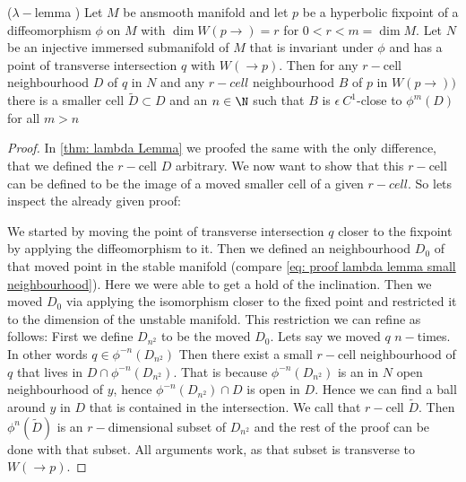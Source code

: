 \begin{lemma}($\lambda-$lemma )
	Let $ M$ be ansmooth manifold and let $p$ be a hyperbolic fixpoint of a diffeomorphism $\phi$ on $M$ with $\dim W(p \to)=r$ for ${0<r<m=\dim M}$. Let $N$ be an injective immersed submanifold of $M$ that is invariant under $\phi$ and has a point of transverse intersection $q$ with $W(\to p)$. Then for any $r-$cell neighbourhood $D$ of $q$ in $N$ and any $r-cell$ neighbourhood $B$ of $p$ in $W(p\to))$ there is a smaller cell $\tilde{D}\subset D$ and an $n\in \N$ such that $B$ is $\epsilon~C^1$-close to $\phi^m(D)$ for all $m>n$
\end{lemma}
\begin{proof}
	In \ref{thm: lambda Lemma} we proofed the same with the only difference, that we defined the $r-$cell $D$ arbitrary. We now want to show that this $r-$cell can be defined to be the image of a moved smaller cell of a given $r-cell$. So lets inspect the already given proof:
	
	We started by moving the point of transverse intersection $q$ closer to the fixpoint by applying the diffeomorphism to it. Then we defined an neighbourhood $D_0$ of that moved point in the stable manifold (compare \ref{eq: proof lambda lemma small neighbourhood}). Here we were able to get a hold of the inclination. Then we moved $D_0$ via applying the isomorphism closer to the fixed point and restricted it to the dimension of the unstable manifold. This restriction we can refine as follows: First we define $D_{n^2}$ to be the moved $D_0$. Lets say we moved $q$ $n-$times. In other words $q\in \phi^{-n}(D_{n^2})$ Then there exist a small $r-$cell neighbourhood of $q$ that lives in $D \cap \phi^{-n}(D_{n^2})$. That is because $ \phi^{-n}(D_{n^2})$ is an in $N$ open neighbourhood of $y$, hence $\phi^{-n}(D_{n^2}) \cap D$ is open in $D$. Hence we can find a ball around $y$ in $D$ that is contained in the intersection. We call that $r-$cell $\tilde{D}$. Then $\phi^n(\tilde{D})$ is an $r-$dimensional subset of $D_{n^2}$ and the rest of the proof can be done with that subset. All arguments work, as that subset is transverse to $W(\to p)$. 
\end{proof}
